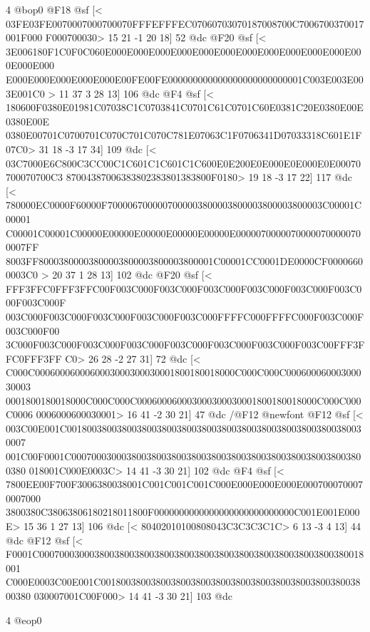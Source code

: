 {{{{{{{{{{4 @bop0
@F18 @sf
[<
03FE03FE0070007000700070FFFEFFFEC07060703070187008700C7006700370017001F000
F000700030>
	 15 21 -1 20 18] 52 @dc
@F20 @sf
[<
3E006180F1C0F0C060E000E000E000E000E000E000E000E000E000E000E000E000E000E000
E000E000E000E000E000E00FE00FE000000000000000000000000001C003E003E003E001C0
>
	 11 37 3 28 13] 106 @dc
@F4 @sf
[<
180600F0380E01981C07038C1C0703841C0701C61C0701C60E0381C20E0380E00E0380E00E
0380E00701C0700701C070C701C070C781E07063C1F0706341D07033318C601E1F07C0>
	 31 18 -3 17 34] 109 @dc
[<
03C7000E6C800C3CC00C1C601C1C601C1C600E0E200E0E000E0E000E0E00070700070700C3
87004387006383802383801383800F0180>
	 19 18 -3 17 22] 117 @dc
[<
780000EC0000F60000F7000067000007000003800003800003800003800003C00001C00001
C00001C00001C00000E00000E00000E00000E00000E00000700000700000700000700007FF
8003FF80003800003800003800003800003800001C00001CC0001DE0000CF00006600003C0
>
	 20 37 1 28 13] 102 @dc
@F20 @sf
[<
FFF3FFC0FFF3FFC00F003C000F003C000F003C000F003C000F003C000F003C000F003C000F
003C000F003C000F003C000F003C000F003C000FFFFC000FFFFC000F003C000F003C000F00
3C000F003C000F003C000F003C000F003C000F003C000F003C000F003C00FFF3FFC0FFF3FF
C0>
	 26 28 -2 27 31] 72 @dc
[<
C000C0006000600060003000300030001800180018000C000C000C00060006000300030003
0001800180018000C000C000C000600060003000300030001800180018000C000C000C0006
0006000600030001>
	 16 41 -2 30 21] 47 @dc
/@F12 @newfont
@F12 @sf
[<
003C00E001C001800380038003800380038003800380038003800380038003800380030007
001C00F0001C00070003000380038003800380038003800380038003800380038003800380
018001C000E0003C>
	 14 41 -3 30 21] 102 @dc
@F4 @sf
[<
7800EE00F700F3006380038001C001C001C001C000E000E000E000E0007000700070007000
3800380C38063806180218011800F0000000000000000000000000000C001E001E000E>
	 15 36 1 27 13] 106 @dc
[<
80402010100808043C3C3C3C1C>
	 6 13 -3 4 13] 44 @dc
@F12 @sf
[<
F0001C00070003000380038003800380038003800380038003800380038003800380018001
C000E0003C00E001C001800380038003800380038003800380038003800380038003800380
030007001C00F000>
	 14 41 -3 30 21] 103 @dc

4 @eop0

}}}}}}}}}}
